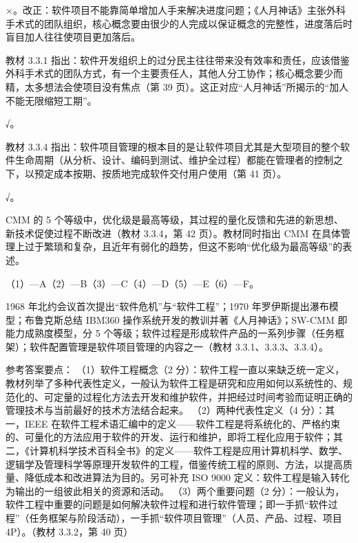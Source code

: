 \documentclass[a4paper,11pt]{article}
\begin{document}
\q ×。改正：软件项目不能靠简单增加人手来解决进度问题；《人月神话》主张外科手术式的团队组织，核心概念要由很少的人完成以保证概念的完整性，进度落后时盲目加人往往使项目更加落后。\begin{analysis}教材 3.3.1 指出：软件开发组织上的过分民主往往带来没有效率和责任，应该借鉴外科手术式的团队方式，有一个主要责任人，其他人分工协作；核心概念要少而精，太多想法会使项目没有焦点（第 39 页）。这正对应“人月神话”所揭示的“加人不能无限缩短工期”。\end{analysis}

\q √。\begin{analysis}教材 3.3.4 指出：软件项目管理的根本目的是让软件项目尤其是大型项目的整个软件生命周期（从分析、设计、编码到测试、维护全过程）都能在管理者的控制之下，以预定成本按期、按质地完成软件交付用户使用（第 41 页）。\end{analysis}

\q √。\begin{analysis}CMM 的 5 个等级中，优化级是最高等级，其过程的量化反馈和先进的新思想、新技术促使过程不断改进（教材 3.3.4，第 42 页）。教材同时指出 CMM 在具体管理上过于繁琐和复杂，且近年有弱化的趋势，但这不影响“优化级为最高等级”的表述。\end{analysis}


\q （1）—A\quad （2）—B\quad （3）—C\quad （4）—D\quad （5）—E\quad （6）—F。
\begin{analysis}1968 年北约会议首次提出“软件危机”与“软件工程”；1970 年罗伊斯提出瀑布模型；布鲁克斯总结 IBM360 操作系统开发的教训并著《人月神话》；SW-CMM 即能力成熟度模型，分 5 个等级；软件过程是形成软件产品的一系列步骤（任务框架）；软件配置管理是软件项目管理的内容之一（教材 3.3.1、3.3.3、3.3.4）。\end{analysis}


\q 参考答案要点：
（1）软件工程概念（2 分）：软件工程一直以来缺乏统一定义，教材列举了多种代表性定义，一般认为软件工程是研究和应用如何以系统性的、规范化的、可定量的过程化方法去开发和维护软件，并把经过时间考验而证明正确的管理技术与当前最好的技术方法结合起来。
（2）两种代表性定义（4 分）：其一，IEEE 在软件工程术语汇编中的定义——软件工程是将系统化的、严格约束的、可量化的方法应用于软件的开发、运行和维护，即将工程化应用于软件；其二，《计算机科学技术百科全书》的定义——软件工程是应用计算机科学、数学、逻辑学及管理科学等原理开发软件的工程，借鉴传统工程的原则、方法，以提高质量、降低成本和改进算法为目的。另可补充 ISO 9000 定义：软件工程是输入转化为输出的一组彼此相关的资源和活动。
（3）两个重要问题（2 分）：一般认为，软件工程中重要的问题是如何解决软件过程和进行软件管理；即一手抓“软件过程”（任务框架与阶段活动），一手抓“软件项目管理”（人员、产品、过程、项目 4P）。（教材 3.3.2，第 40 页）
\end{document}
